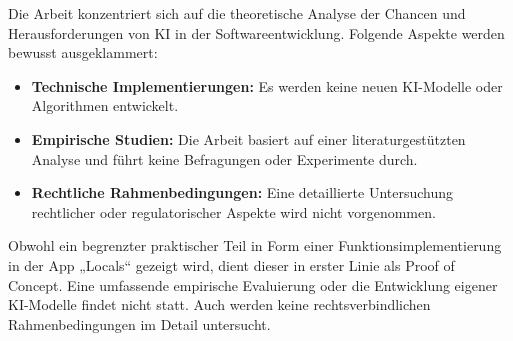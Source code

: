 Die Arbeit konzentriert sich auf die theoretische Analyse der Chancen und Herausforderungen von KI in der Softwareentwicklung. Folgende Aspekte werden bewusst ausgeklammert:

\begin{itemize}
    \item \textbf{Technische Implementierungen:} Es werden keine neuen KI-Modelle oder Algorithmen entwickelt.
    \item  \textbf{Empirische Studien:} Die Arbeit basiert auf einer literaturgestützten Analyse und führt keine Befragungen oder Experimente durch.
    \item \textbf{Rechtliche Rahmenbedingungen:} Eine detaillierte Untersuchung rechtlicher oder regulatorischer Aspekte wird nicht vorgenommen.
\end{itemize}

Obwohl ein begrenzter praktischer Teil in Form einer Funktionsimplementierung in der App „Locals“ gezeigt wird, dient dieser in erster Linie als Proof of Concept. Eine umfassende empirische Evaluierung oder die Entwicklung eigener KI-Modelle findet nicht statt. Auch werden keine rechtsverbindlichen Rahmenbedingungen im Detail untersucht.